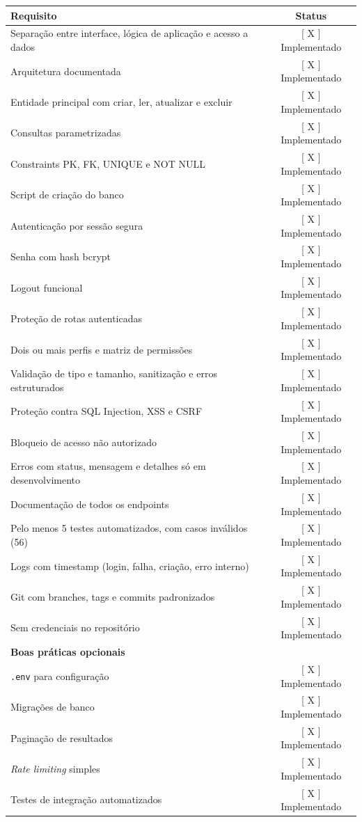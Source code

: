 \documentclass[12pt,a4paper]{article}
\newcommand{\cod}[1]{\texttt{#1}}
\newcommand{\impl}{[ X ] Implementado}
\begin{document}
\begin{longtable}{|p{9.6cm}|c|}
\hline
\textbf{Requisito} & \textbf{Status} \\ \hline
\endhead
Separação entre interface, lógica de aplicação e acesso a dados & \impl \\ \hline
Arquitetura documentada & \impl \\ \hline
Entidade principal com criar, ler, atualizar e excluir & \impl \\ \hline
Consultas parametrizadas & \impl \\ \hline
Constraints PK, FK, UNIQUE e NOT NULL & \impl \\ \hline
Script de criação do banco & \impl \\ \hline
Autenticação por sessão segura & \impl \\ \hline
Senha com hash bcrypt & \impl \\ \hline
Logout funcional & \impl \\ \hline
Proteção de rotas autenticadas & \impl \\ \hline
Dois ou mais perfis e matriz de permissões & \impl \\ \hline
Validação de tipo e tamanho, sanitização e erros estruturados & \impl \\ \hline
Proteção contra SQL Injection, XSS e CSRF & \impl \\ \hline
Bloqueio de acesso não autorizado & \impl \\ \hline
Erros com status, mensagem e detalhes só em desenvolvimento & \impl \\ \hline
Documentação de todos os endpoints & \impl \\ \hline
Pelo menos 5 testes automatizados, com casos inválidos (56) & \impl \\ \hline
Logs com timestamp (login, falha, criação, erro interno) & \impl \\ \hline
Git com branches, tags e commits padronizados & \impl \\ \hline
Sem credenciais no repositório & \impl \\ \hline
\multicolumn{2}{|l|}{\textbf{Boas práticas opcionais}} \\ \hline
\cod{.env} para configuração & \impl \\ \hline
Migrações de banco & \impl \\ \hline
Paginação de resultados & \impl \\ \hline
\textit{Rate limiting} simples & \impl \\ \hline
Testes de integração automatizados & \impl \\ \hline
\end{longtable}
\end{document}
